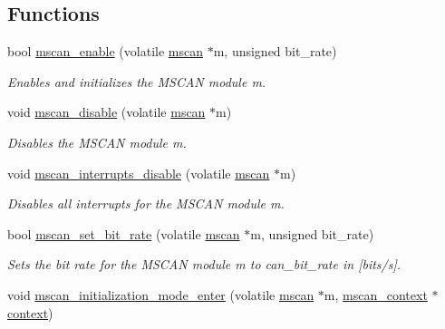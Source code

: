 \subsection*{Functions}
\begin{DoxyCompactItemize}
\item 
bool \mbox{\hyperlink{group__RTEMSBSPsPowerPCGen5200MSCAN_ga8b80a3020d69fd2993928c0aae87b068}{mscan\+\_\+enable}} (volatile \mbox{\hyperlink{group__RTEMSBSPsPowerPCGen5200MSCAN_gacfd56a4a482c5e7da2cff003284b2d51}{mscan}} $\ast$m, unsigned bit\+\_\+rate)
\begin{DoxyCompactList}\small\item\em Enables and initializes the M\+S\+C\+AN module {\itshape m}. \end{DoxyCompactList}\item 
void \mbox{\hyperlink{group__RTEMSBSPsPowerPCGen5200MSCAN_gad8c8f94ea2a29e3052664a870319cbec}{mscan\+\_\+disable}} (volatile \mbox{\hyperlink{group__RTEMSBSPsPowerPCGen5200MSCAN_gacfd56a4a482c5e7da2cff003284b2d51}{mscan}} $\ast$m)
\begin{DoxyCompactList}\small\item\em Disables the M\+S\+C\+AN module {\itshape m}. \end{DoxyCompactList}\item 
void \mbox{\hyperlink{group__RTEMSBSPsPowerPCGen5200MSCAN_gad41e407b85565ec829d2d47f3ae874a2}{mscan\+\_\+interrupts\+\_\+disable}} (volatile \mbox{\hyperlink{group__RTEMSBSPsPowerPCGen5200MSCAN_gacfd56a4a482c5e7da2cff003284b2d51}{mscan}} $\ast$m)
\begin{DoxyCompactList}\small\item\em Disables all interrupts for the M\+S\+C\+AN module {\itshape m}. \end{DoxyCompactList}\item 
bool \mbox{\hyperlink{group__RTEMSBSPsPowerPCGen5200MSCAN_gab0041bb347543a53b2f8bcde1cc6a586}{mscan\+\_\+set\+\_\+bit\+\_\+rate}} (volatile \mbox{\hyperlink{group__RTEMSBSPsPowerPCGen5200MSCAN_gacfd56a4a482c5e7da2cff003284b2d51}{mscan}} $\ast$m, unsigned bit\+\_\+rate)
\begin{DoxyCompactList}\small\item\em Sets the bit rate for the M\+S\+C\+AN module {\itshape m} to {\itshape can\+\_\+bit\+\_\+rate} in \mbox{[}bits/s\mbox{]}. \end{DoxyCompactList}\item 
void \mbox{\hyperlink{group__RTEMSBSPsPowerPCGen5200MSCAN_ga587e0d7b0c1d090fda013c551f02a3f7}{mscan\+\_\+initialization\+\_\+mode\+\_\+enter}} (volatile \mbox{\hyperlink{group__RTEMSBSPsPowerPCGen5200MSCAN_gacfd56a4a482c5e7da2cff003284b2d51}{mscan}} $\ast$m, \mbox{\hyperlink{structmscan__context}{mscan\+\_\+context}} $\ast$\mbox{\hyperlink{sun4u_2tte_8h_a9b4a99475e2709333b8e5d70483173f1}{context}})

\end{DoxyCompactItemize}
